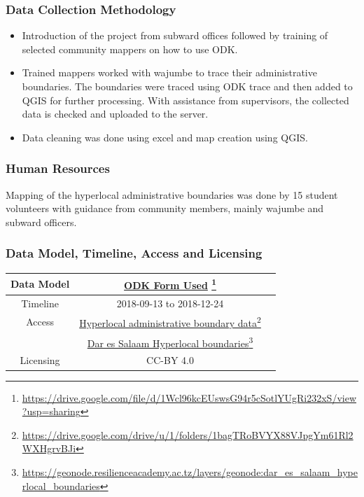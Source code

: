 \documentclass[a4paper,12pt,twoside]{article}
\begin{document}
\subsubsection{Data Collection Methodology}
\begin{itemize}
    \item Introduction of the project from subward offices followed by training of selected community mappers on how to use ODK.
    \item Trained mappers worked with wajumbe to trace their administrative boundaries. The boundaries were traced using ODK trace and then added to QGIS for further processing. With assistance from supervisors, the collected data is checked and uploaded to the server. 
    \item Data cleaning was done using excel  and map creation using QGIS.
\end{itemize}

\subsubsection{Human Resources}
Mapping of the hyperlocal administrative boundaries was done by 15 student volunteers with guidance from community members, mainly wajumbe and subward officers.

\subsubsection{Data Model, Timeline, Access and Licensing}
\begin{center}
\begin{tabular}{|c|c|c|}  
 \hline
Data Model &
        \href{https://drive.google.com/file/d/1Wcl96kcEUswsG94r5cSotlYUgRi232xS/view?usp=sharing}{ODK Form Used} \footnote{\url{https://drive.google.com/file/d/1Wcl96kcEUswsG94r5cSotlYUgRi232xS/view?usp=sharing}} \\
 \hline
  Timeline  &  2018-09-13 to 2018-12-24 \\
\hline  
 Access  & 
    \href{https://drive.google.com/drive/u/1/folders/1bagTRoBVYX88VJpgYm61Rl2WXHgrvBJi}{Hyperlocal administrative boundary data}\footnote{\url{https://drive.google.com/drive/u/1/folders/1bagTRoBVYX88VJpgYm61Rl2WXHgrvBJi}} \\
    {} & \href{https://geonode.resilienceacademy.ac.tz/layers/geonode:dar_es_salaam_hyperlocal_boundaries}{Dar es Salaam Hyperlocal boundaries}\footnote{\url{https://geonode.resilienceacademy.ac.tz/layers/geonode:dar_es_salaam_hyperlocal_boundaries}}\\
   
\hline 
    Licensing & CC-BY 4.0 \\
\hline
\end{tabular}
\end{center}
\end{document}
